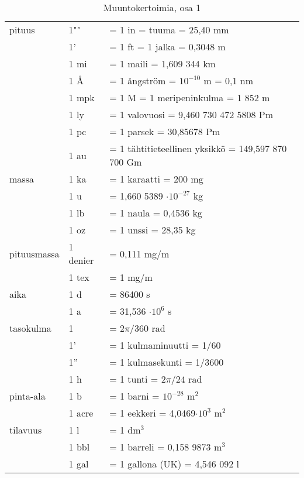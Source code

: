 \begin{table}
\centering
\setlength{\extrarowheight}{2pt}
\caption{Muuntokertoimia, osa 1 \cite{MAOL}}
\begin{tabular}{l|ll}
\hline
pituus	& 1""	& = 1 in = tuuma = 25,40 mm \\
		& 1'	& = 1 ft = 1 jalka = 0,3048 m \\
		& 1 mi	& = 1 maili = 1,609 344 km \\
		& 1 Å	& = 1 ångström = $10^{-10}$ m = 0,1 nm \\
		& 1 mpk	& = 1 M = 1 meripeninkulma = 1 852 m \\
		& 1 ly	& = 1 valovuosi = 9,460 730 472 5808 Pm \quad \cite{IAU-Measuring} \\
		& 1 pc	& = 1 parsek = 30,85678 Pm \\
		& 1 au	& = 1 tähtitieteellinen yksikkö = 149,597 870 700 Gm \quad \cite{IAU-Measuring} \\
\hline
massa	& 1 ka	& = 1 karaatti = 200 mg \\
		& 1 u	& = 1,660 5389 $\cdot 10^{-27}$ kg \\
		& 1 lb	& = 1 naula = 0,4536 kg \\
		& 1 oz	& = 1 unssi = 28,35 kg \\
\hline
pituusmassa	& 1 denier	& = 0,111 mg/m \\
			& 1 tex		& = 1 mg/m \\
\hline
aika	& 1 d	& = 86400 s \\
		& 1 a	& = 31,536 $\cdot 10^6$ s \\
\hline
tasokulma	& 1\degree	& = $2 \pi /360$ rad \\
			& 1'		& = 1 kulmaminuutti = 1/60\degree \\
			& 1''		& = 1 kulmasekunti = 1/3600\degree \\
			& 1 h		& = 1 tunti = $2 \pi / 24$ rad \\
\hline
pinta-ala	& 1 b		& = 1 barni = $10^{-28}$ m$^2$ \\
			& 1 acre	& = 1 eekkeri = 4,0469$\cdot 10^3$ m$^2$ \\
\hline
tilavuus	& 1 l		& = 1 dm$^3$ \\
			& 1 bbl		& = 1 barreli = 0,158 9873 m$^3$ \\
			& 1 gal		& = 1 gallona (UK) = 4,546 092 l \\

\end{tabular}
\end{table}
